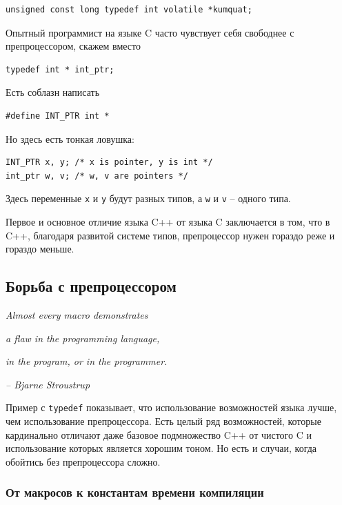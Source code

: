 \documentclass[a4paper,12pt,oneside]{article}
\begin{document}
\begin{lstlisting}
unsigned const long typedef int volatile *kumquat;
\end{lstlisting}

Опытный программист на языке C часто чувствует себя свободнее с препроцессором, скажем вместо

\begin{lstlisting}
typedef int * int_ptr;
\end{lstlisting}

Есть соблазн написать

\begin{lstlisting}
#define INT_PTR int *
\end{lstlisting}

Но здесь есть тонкая ловушка:

\begin{lstlisting}
INT_PTR x, y; /* x is pointer, y is int */
int_ptr w, v; /* w, v are pointers */
\end{lstlisting}

Здесь переменные \lstinline!x! и \lstinline!y! будут разных типов, а \lstinline!w! и \lstinline!v! – одного типа.

Первое и основное отличие языка C++ от языка C заключается в том, что в C++, благодаря развитой системе типов, препроцессор нужен гораздо реже и гораздо меньше.

\pagebreak
\subsection{Борьба с препроцессором}

\hfill\textit{Almost every macro demonstrates}

\hfill\textit{a flaw in the programming language,}

\hfill\textit{in the program, or in the programmer.}{\vspace{0.5em}}

\hfill\textit{-- Bjarne Stroustrup}

Пример с \lstinline!typedef! показывает, что использование возможностей языка лучше, чем использование препроцессора. Есть целый ряд возможностей, которые кардинально отличают даже базовое подмножество C++ от чистого C и использование которых является хорошим тоном. Но есть и случаи, когда обойтись без препроцессора сложно.

\subsubsection{От макросов к константам времени компиляции}\label{ConstVsDef}
\end{document}
